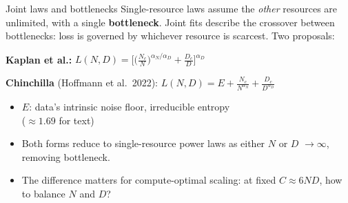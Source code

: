 \documentclass[11pt]{beamer}
\newcommand{\hl}[1]{{\color{blue!60!black}\textbf{#1}}}
\begin{document}
\begin{frame}{Joint laws and bottlenecks}
  Single-resource laws assume the \emph{other} resources are unlimited, with a single \hl{bottleneck}.
  Joint fits describe the crossover between bottlenecks: loss is
  governed by whichever resource is scarcest.  \pause Two proposals:
  \vspace{1mm}

  \hl{Kaplan et al.:}\quad
  $\displaystyle
    L(N, D) = \Big[\Big(\tfrac{N_c}{N}\Big)^{\alpha_N/\alpha_D}
    + \tfrac{D_c}{D}\Big]^{\alpha_D}
  $
  \vspace{1mm}

  \hl{Chinchilla} (Hoffmann et al.\ 2022):\quad
  $\displaystyle
    L(N, D) = E + \frac{N_c}{N^{\alpha_N}} + \frac{D_c}{D^{\alpha_D}}
  $  \pause
  \vspace{1mm}

  \begin{itemize}
    \item $E$: data's intrinsic noise floor, irreducible entropy \\ ($\approx 1.69$ for text)  \pause
    \item Both forms reduce to single-resource power laws as either $N$ or $D$ $\to\infty$, removing bottleneck.  \pause
    \item The difference matters for compute-optimal scaling: at fixed $C\approx 6ND$, how to balance $N$ and $D$?
  \end{itemize}
\end{frame}
\end{document}
